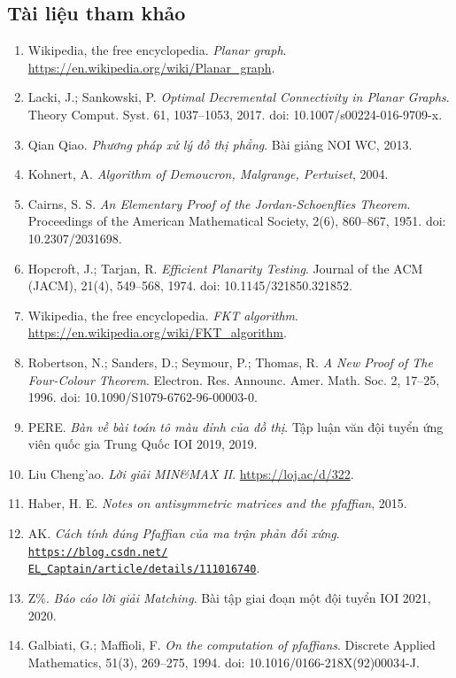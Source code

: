 \documentclass[11pt]{article}
\begin{document}
\subsection*{Tài liệu tham khảo}

\begin{enumerate}
  \item Wikipedia, the free encyclopedia. \emph{Planar graph}.
  \url{https://en.wikipedia.org/wiki/Planar_graph}.
  \item Lacki, J.; Sankowski, P. \emph{Optimal Decremental Connectivity in
  Planar Graphs}. Theory Comput. Syst. 61, 1037--1053, 2017.
  doi: 10.1007/s00224-016-9709-x.
  \item Qian Qiao. \emph{Phương pháp xử lý đồ thị phẳng}. Bài giảng NOI WC,
  2013.
  \item Kohnert, A. \emph{Algorithm of Demoucron, Malgrange, Pertuiset}, 2004.
  \item Cairns, S. S. \emph{An Elementary Proof of the
  Jordan-Schoenflies Theorem}. Proceedings of the American Mathematical
  Society, 2(6), 860--867, 1951. doi: 10.2307/2031698.
  \item Hopcroft, J.; Tarjan, R. \emph{Efficient Planarity Testing}. Journal of
  the ACM (JACM), 21(4), 549--568, 1974. doi: 10.1145/321850.321852.
  \item Wikipedia, the free encyclopedia. \emph{FKT algorithm}.
  \url{https://en.wikipedia.org/wiki/FKT_algorithm}.
  \item Robertson, N.; Sanders, D.; Seymour, P.; Thomas, R. \emph{A New Proof
  of The Four-Colour Theorem}. Electron. Res. Announc. Amer. Math. Soc. 2,
  17--25, 1996. doi: 10.1090/S1079-6762-96-00003-0.
  \item PERE. \emph{Bàn về bài toán tô màu đỉnh của đồ thị}. Tập luận văn đội
  tuyển ứng viên quốc gia Trung Quốc IOI 2019, 2019.
  \item Liu Cheng'ao. \emph{Lời giải MIN\&MAX II}.
  \url{https://loj.ac/d/322}.
  \item Haber, H. E. \emph{Notes on antisymmetric matrices and the pfaffian},
  2015.
  \item AK. \emph{Cách tính đúng Pfaffian của ma trận phản đối xứng}.
  \href{https://blog.csdn.net/EL_Captain/article/details/111016740}
  {\texttt{https://blog.csdn.net/}\\
  \texttt{EL\_Captain/article/details/111016740}}.
  \item Z\%. \emph{Báo cáo lời giải Matching}. Bài tập giai đoạn một đội tuyển
  IOI 2021, 2020.
  \item Galbiati, G.; Maffioli, F. \emph{On the computation of pfaffians}.
  Discrete Applied Mathematics, 51(3), 269--275, 1994.
  doi: 10.1016/0166-218X(92)00034-J.
\end{enumerate}
\end{document}
